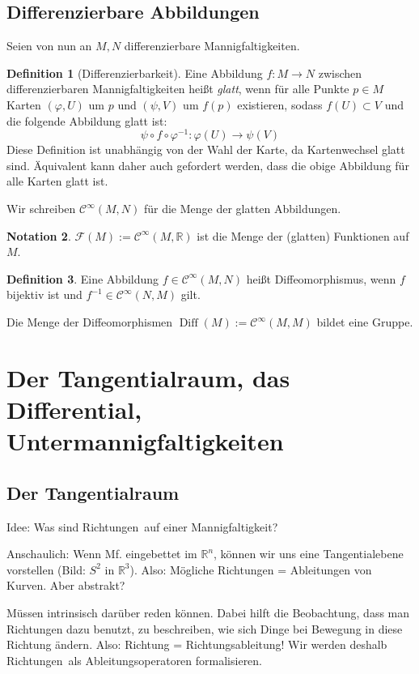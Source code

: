\documentclass[a4paper]{scrreprt}
\numberwithin{equation}{chapter}
\DeclareMathOperator{\Diff}{Diff}
\newcommand{\R}{\mathbb{R}}
\newcommand{\sC}{\mathcal{C}^{\infty}}
\newcommand{\sm}{\mathcal{F}(M)}
\theoremstyle{definition}
\newtheorem{defn}{Definition}[section]
\newtheorem{nota}[defn]{Notation}
\newcommand{\kommP}[2][noinline]{\todo[#1,color=green!40]{#2}}
\begin{document}
	\section{Differenzierbare Abbildungen}
		Seien von nun an $M,N$ differenzierbare Mannigfaltigkeiten.
		\begin{defn}[Differenzierbarkeit]
			Eine Abbildung $f\colon M\rightarrow N$ zwischen differenzierbaren Mannigfaltigkeiten heißt \emph{glatt}, wenn für alle Punkte $p\in M$ Karten $(\varphi,U)$ um  $p$ und $(\psi,V)$ um $f(p)$ existieren, sodass $f(U)\subset V$ und die folgende Abbildung glatt ist:
			\kommP{Evtl. $C^k$ definieren?}
			\begin{equation}
				\psi\circ f \circ \varphi^{-1}\colon \varphi(U)\rightarrow \psi(V)
			\end{equation}
			Diese Definition ist unabhängig von der Wahl der Karte, da Kartenwechsel glatt sind. Äquivalent kann daher auch gefordert werden, dass die obige Abbildung für alle Karten glatt ist.

			Wir schreiben $\sC(M,N)$ für die Menge der glatten Abbildungen.
		\end{defn}
		\begin{nota}
			$\sm:=\sC(M,\R)$ ist die Menge der (glatten) Funktionen auf $M$.
		\end{nota}
		\begin{defn}
			Eine Abbildung $f\in\sC(M,N)$ heißt Diffeomorphismus, wenn $f$ bijektiv ist und $f^{-1}\in\sC(N,M)$ gilt.

			Die Menge der Diffeomorphismen $\Diff(M):=\sC(M,M)$ bildet eine Gruppe.
		\end{defn}

\chapter{Der Tangentialraum, das Differential, Untermannigfaltigkeiten}

\section{Der Tangentialraum}
Idee: Was sind \glqq Richtungen\grqq\ auf einer Mannigfaltigkeit?

Anschaulich: Wenn Mf. eingebettet im $\mathbb R^n$, können wir uns eine Tangentialebene vorstellen (Bild: $S^2$ in $\mathbb R^3$). Also: Mögliche Richtungen = Ableitungen von Kurven. Aber abstrakt?

Müssen intrinsisch darüber reden können. Dabei hilft die Beobachtung, dass man Richtungen dazu benutzt, zu beschreiben, wie sich Dinge bei Bewegung in diese Richtung ändern. Also: Richtung = Richtungsableitung! Wir werden deshalb \glqq Richtungen\grqq\ als Ableitungsoperatoren formalisieren.
\end{document}
